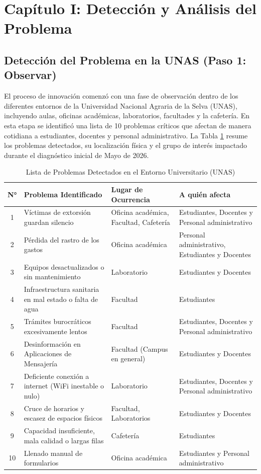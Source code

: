 \documentclass[12pt]{article}
\begin{document}
\newpage

\section{Capítulo I: Detección y Análisis del Problema}

\subsection{Detección del Problema en la UNAS (Paso 1: Observar)}
El proceso de innovación comenzó con una fase de observación dentro de los diferentes entornos de la Universidad Nacional Agraria de la Selva (UNAS), incluyendo aulas, oficinas académicas, laboratorios, facultades y la cafetería. En esta etapa se identificó una lista de 10 problemas críticos que afectan de manera cotidiana a estudiantes, docentes y personal administrativo. La Tabla \ref{tab:problemas_detectados} resume los problemas detectados, su localización física y el grupo de interés impactado durante el diagnóstico inicial de Mayo de 2026.

\begin{table}[H]
\centering
\singlespacing
\caption{Lista de Problemas Detectados en el Entorno Universitario (UNAS)}
\label{tab:problemas_detectados}
\begin{tabular}{cp{5.5cm}p{3.5cm}p{5.5cm}}
\toprule
\textbf{N°} & \textbf{Problema Identificado} & \textbf{Lugar de Ocurrencia} & \textbf{A quién afecta} \\
\midrule
1 & Víctimas de extorsión guardan silencio & Oficina académica, Facultad, Cafetería & Estudiantes, Docentes y Personal administrativo \\
2 & Pérdida del rastro de los gastos & Oficina académica & Personal administrativo, Estudiantes y Docentes \\
3 & Equipos desactualizados o sin mantenimiento & Laboratorio & Estudiantes y Docentes \\
4 & Infraestructura sanitaria en mal estado o falta de agua & Facultad & Estudiantes \\
5 & Trámites burocráticos excesivamente lentos & Facultad & Estudiantes, Docentes y Personal administrativo \\
6 & Desinformación en Aplicaciones de Mensajería & Facultad (Campus en general) & Estudiantes y Docentes \\
7 & Deficiente conexión a internet (WiFi inestable o nulo) & Laboratorio & Estudiantes, Docentes y Personal administrativo \\
8 & Cruce de horarios y escasez de espacios físicos & Facultad, Laboratorios & Estudiantes y Docentes \\
9 & Capacidad insuficiente, mala calidad o largas filas & Cafetería & Estudiantes \\
10 & Llenado manual de formularios & Oficina académica & Estudiantes y Personal administrativo \\
\bottomrule
\end{tabular}
\end{table}
\end{document}

